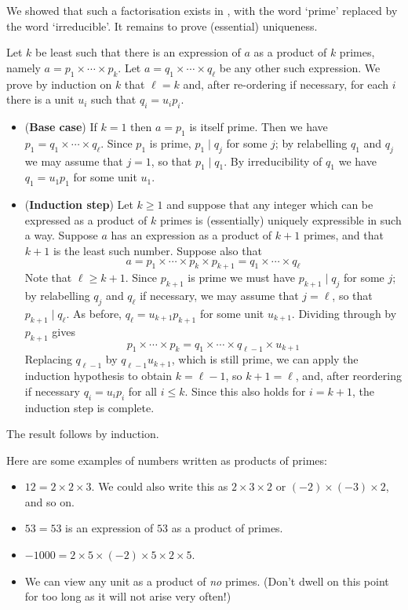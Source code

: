 \begin{cproof}
We showed that such a factorisation exists in , with the word `prime' replaced by the word `irreducible'. It remains to prove (essential) uniqueness.

Let $k$ be least such that there is an expression of $a$ as a product of $k$ primes, namely $a = p_1 \times \cdots \times p_k$. Let $a = q_1 \times \cdots \times q_{\ell}$ be any other such expression. We prove by induction on $k$ that $\ell = k$ and, after re-ordering if necessary, for each $i$ there is a unit $u_i$ such that $q_i = u_ip_i$.

\begin{itemize}
\item (\textbf{Base case}) If $k=1$ then $a=p_1$ is itself prime. Then we have $p_1 = q_1 \times \cdots \times q_{\ell}$. Since $p_1$ is prime, $p_1 \mid q_j$ for some $j$; by relabelling $q_1$ and $q_j$ we may assume that $j = 1$, so that $p_1 \mid q_1$. By irreducibility of $q_1$ we have $q_1 = u_1p_1$ for some unit $u_1$.
\item (\textbf{Induction step}) Let $k \ge 1$ and suppose that any integer which can be expressed as a product of $k$ primes is (essentially) uniquely expressible in such a way. Suppose $a$ has an expression as a product of $k+1$ primes, and that $k+1$ is the least such number. Suppose also that
\[ a = p_1 \times \cdots \times p_k \times p_{k+1} = q_1 \times \cdots \times q_{\ell} \]
Note that $\ell \ge k+1$. Since $p_{k+1}$ is prime we must have $p_{k+1} \mid q_j$ for some $j$; by relabelling $q_j$ and $q_{\ell}$ if necessary, we may assume that $j=\ell$, so that $p_{k+1} \mid q_{\ell}$. As before, $q_{\ell} = u_{k+1}p_{k+1}$ for some unit $u_{k+1}$. Dividing through by $p_{k+1}$ gives
\[ p_1 \times \cdots \times p_k = q_1 \times \cdots \times q_{\ell-1} \times u_{k+1} \]
Replacing $q_{\ell-1}$ by $q_{\ell-1}u_{k+1}$, which is still prime, we can apply the induction hypothesis to obtain $k=\ell-1$, so $k+1=\ell$, and, after reordering if necessary $q_i=u_ip_i$ for all $i \le k$. Since this also holds for $i=k+1$, the induction step is complete.
\end{itemize}
The result follows by induction.
\end{cproof}

\begin{example} \label{exFTAExamples}
Here are some examples of numbers written as products of primes:
\begin{itemize}
\item $12 = 2 \times 2 \times 3$. We could also write this as $2 \times 3 \times 2$ or $(-2) \times (-3) \times 2$, and so on.
\item $53 = 53$ is an expression of $53$ as a product of primes.
\item $-1000 = 2 \times 5 \times (-2) \times 5 \times 2 \times 5$.
\item We can view any unit as a product of \textit{no} primes. (Don't dwell on this point for too long as it will not arise very often!)
\end{itemize}
\end{example}

